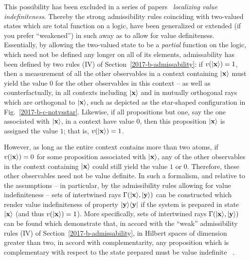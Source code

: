 \documentclass[%
  twocolumn,
 showpacs,
 showkeys,
 preprintnumbers,
 amsmath,amssymb,
 aps,
  pra,
  longbibliography,
 floatfix,
 ]{revtex4-1}
\begin{document}
This possibility  has been excluded in a series of papers~\cite{Abbott:2010uq,2012-incomput-proofsCJ,PhysRevA.89.032109,2015-AnalyticKS}
{\em localizing value indefiniteness}.
Thereby the strong admissibility rules coinciding with two-valued states which are total function on a logic, have been generalized or extended (if you prefer ``weakened'')
in such away as to allow for value definiteness.
Essentially, by allowing the two-valued state to be a {\em partial} function on the logic,
which need not be defined any longer on all of its elements,
admissability has been defined by two rules (IV) of Section~\ref{2017-b-admissability}:
if $v ( \vert {\bf x} \rangle ) = 1$, then a measurement of all the other observables in a context  containing $\vert {\bf x} \rangle$  must yield
the value  $0$  for the other observables in this
context -- as well as counterfactually, in all contexts including $\vert {\bf x} \rangle$ and in mutually orthogonal rays which are orthogonal to $\vert {\bf x} \rangle$,
such as depicted as the star-shaped configuration in Fig.~\ref{2017-b-c-notvsstar}.
Likewise, if all propositions but one, say the one associated with $\vert {\bf x} \rangle$, in a context have value $0$, then this proposition $\vert {\bf x} \rangle$
is assigned the value $1$; that is,  $v ( \vert {\bf x} \rangle ) = 1$.

However,
as long as the entire context contains more than two atoms,
if  $v ( \vert {\bf x} \rangle ) = 0$ for some proposition associated with $\vert {\bf x} \rangle $,
any of the other observables in the context containing $\vert {\bf x} \rangle$ could
still yield the value $1$ or $0$.
Therefore, these other observables need not be  value definite.
In such a formalism, and relative to the assumptions -- in particular,
by the admissibility rules allowing for value indefiniteness
--
sets of intertwined rays  $\Gamma ( \vert {\bf x} \rangle , \vert {\bf y} \rangle )$
can be constructed
which render value indefiniteness of property $\vert {\bf y} \rangle  \langle {\bf y} \vert $
if the system is prepared in state $\vert {\bf x} \rangle$ (and thus $ v( \vert {\bf x} \rangle )=1$).
More specifically,
sets of intertwined rays  $\Gamma ( \vert {\bf x} \rangle , \vert {\bf y} \rangle )$
can be found which demonstrate that, in accord with the ``weak'' admissibility rules (IV)
of Section~\ref{2017-b-admissability},
in Hilbert spaces of dimension greater than two,
in accord with complementarity,
any proposition which is complementary with respect to the state prepared
must be value indefinite ~\cite{Abbott:2010uq,2012-incomput-proofsCJ,PhysRevA.89.032109,2015-AnalyticKS}.
\end{document}
